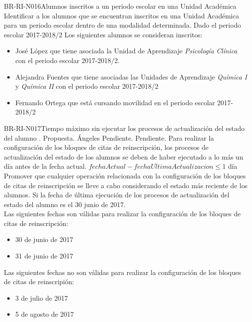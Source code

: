 \begin{BusinessRule}{BR-RI-N016}{Alumnos inscritos a un periodo escolar en una Unidad Académica}
	\BRItem[Motivación] Identificar a los alumnos que se encuentran inscritos en una Unidad Académica para un periodo escolar dentro de una modalidad determinada.
	\BRItem[Ejemplo] Dado el periodo escolar 2017-2018/2
		Los siguientes alumnos se consideran inscritos:
		\begin{itemize}
			\item José López que tiene asociada la Unidad de Aprendizaje {\it Psicología Clínica} con el periodo escolar 2017-2018/2.
			\item Alejandra Fuentes que tiene asociadas las Unidades de Aprendizaje {\it Química I} y {\it Química II} con el periodo escolar 2017-2018/2
			\item Fernando Ortega que está cursando movilidad en el periodo escolar 2017-2018/2
		\end{itemize}
\end{BusinessRule}

\begin{BusinessRule}{BR-RI-N017}{Tiempo máximo sin ejecutar los procesos de actualización del estado del alumno}
	{\bcCondition}    %
	{\btEnabler}     %
	{\blControlling}    %
	.
	\BRItem[Estado] Propuesta.
	 Ángeles
	 Pendiente.
	 Pendiente.
	\BRItem[Descripción] Para realizar la configuración de los bloques de citas de reinscripción, los procesos de actualización del estado de los alumnos se deben de haber ejecutado a lo más un día antes de la fecha actual.
	\BRItem[Sentencia] $fechaActual - fechaUltimaActualizacion \leq 1 $ día
	\BRItem[Motivación] Promover que cualquier operación relacionada con la configuración de los bloques de citas de reinscripción se lleve a cabo considerando el estado más reciente de los alumnos.
	\BRItem[Ejemplo:] Si la fecha de última ejecución de los procesos de actualización del estado del alumno es el 30 junio de 2017.\\
	Las siguientes fechas son válidas para realizar la configuración de los bloques de citas de reinscripción:
		\begin{itemize}
			\item 30 de junio de 2017
			\item 31 de junio de 2017
		\end{itemize}
	
	Las siguientes fechas no son válidas para realizar la configuración de los bloques de citas de reinscripión:
	\begin{itemize}
		\item 3 de julio de 2017
		\item 5 de agosto de 2017
	\end{itemize}
	
\end{BusinessRule}

